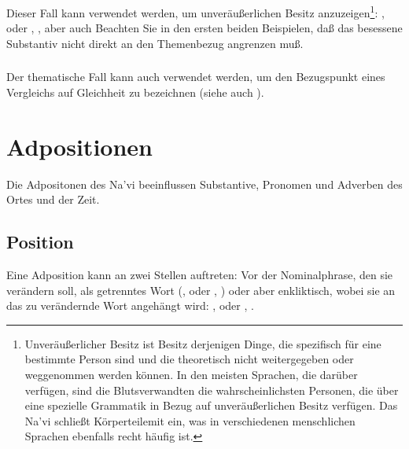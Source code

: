 \subsubsection{} Dieser Fall kann verwendet werden, um unver\"au\ss{}erlichen Besitz
anzuzeigen\footnote{Unver\"au\ss{}erlicher Besitz ist Besitz derjenigen Dinge, die spezifisch
f\"ur eine bestimmte Person sind und die theoretisch nicht weitergegeben oder weggenommen
werden k\"onnen. In den meisten Sprachen, die dar\"uber verf\"ugen, sind die Blutsverwandten
die wahrscheinlichsten Personen, die \"uber eine spezielle Grammatik in Bezug auf
unver\"au\ss{}erlichen Besitz verf\"ugen. Das Na’vi schlie\ss{}t K\"orperteilemit ein, was in
verschiedenen menschlichen Sprachen ebenfalls recht h\"aufig ist.}: ,  oder
, ,
aber auch  
Beachten Sie in den ersten beiden Beispielen, da\ss{} das besessene Substantiv nicht direkt
an den Themenbezug angrenzen mu\ss{}.\label{syn:topical:poss}

\subsubsection{} Der thematische Fall kann auch verwendet werden, um den Bezugspunkt
eines Vergleichs auf Gleichheit zu bezeichnen (siehe auch ).


\section{Adpositionen}
\noindent Die Adpositonen des Na’vi beeinflussen Substantive, Pronomen und Adverben des
Ortes und der Zeit.

\subsection{Position} Eine Adposition kann an zwei Stellen auftreten: Vor der Nominalphrase,
den sie ver\"andern soll, als getrenntes Wort (,
 oder , ) oder aber enkliktisch, wobei sie an
das zu ver\"andernde Wort angeh\"angt wird: ,
 oder ,
.\label{syn:adp:position}

